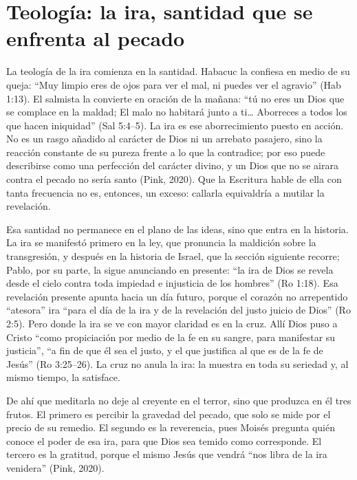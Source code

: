 \section{Teología: la ira, santidad que se enfrenta al pecado}

La teología de la ira comienza en la santidad. Habacuc la confiesa en medio de su queja: ``Muy limpio eres de ojos para ver el mal, ni puedes ver el agravio'' (Hab 1:13). El salmista la convierte en oración de la mañana: ``tú no eres un Dios que se complace en la maldad; El malo no habitará junto a ti\ldots{} Aborreces a todos los que hacen iniquidad'' (Sal 5:4--5). La ira es ese aborrecimiento puesto en acción. No es un rasgo añadido al carácter de Dios ni un arrebato pasajero, sino la reacción constante de su pureza frente a lo que la contradice; por eso puede describirse como una perfección del carácter divino, y un Dios que no se airara contra el pecado no sería santo (Pink, 2020). Que la Escritura hable de ella con tanta frecuencia no es, entonces, un exceso: callarla equivaldría a mutilar la revelación.

Esa santidad no permanece en el plano de las ideas, sino que entra en la historia. La ira se manifestó primero en la ley, que pronuncia la maldición sobre la transgresión, y después en la historia de Israel, que la sección siguiente recorre; Pablo, por su parte, la sigue anunciando en presente: ``la ira de Dios se revela desde el cielo contra toda impiedad e injusticia de los hombres'' (Ro 1:18). Esa revelación presente apunta hacia un día futuro, porque el corazón no arrepentido ``atesora'' ira ``para el día de la ira y de la revelación del justo juicio de Dios'' (Ro 2:5). Pero donde la ira se ve con mayor claridad es en la cruz. Allí Dios puso a Cristo ``como propiciación por medio de la fe en su sangre, para manifestar su justicia'', ``a fin de que él sea el justo, y el que justifica al que es de la fe de Jesús'' (Ro 3:25--26). La cruz no anula la ira: la muestra en toda su seriedad y, al mismo tiempo, la satisface.

De ahí que meditarla no deje al creyente en el terror, sino que produzca en él tres frutos. El primero es percibir la gravedad del pecado, que solo se mide por el precio de su remedio. El segundo es la reverencia, pues Moisés pregunta quién conoce el poder de esa ira, para que Dios sea temido como corresponde. El tercero es la gratitud, porque el mismo Jesús que vendrá ``nos libra de la ira venidera'' (Pink, 2020).

